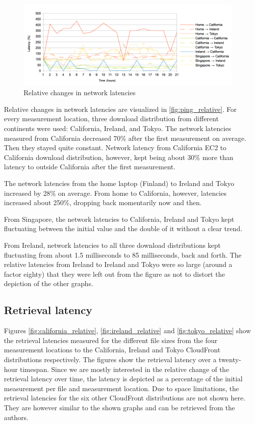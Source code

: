 \documentclass[conference]{IEEEtran}
\begin{document}
\begin{figure}[h]
    \centering
    \includegraphics[width=6in]{images/pings_relative.png}
    \caption[]{Relative changes in network latencies}
    \label{fig:ping_relative}
\end{figure}

Relative changes in network latencies are visualized in \autoref{fig:ping_relative}. For every measurement location, three download distribution from different continents were used: California, Ireland, and Tokyo. The network latencies measured from California decreased 70\% after the first measurement on average. Then they stayed quite constant. Network latency from California EC2 to California download distribution, however, kept being about 30\% more than latency to outside California after the first measurement.

The network latencies from the home laptop (Finland) to Ireland and Tokyo increased by 28\% on average. From home to California, however, latencies increased about 250\%, dropping back momentarily now and then.

From Singapore, the network latencies to California, Ireland and Tokyo kept fluctuating between the initial value and the double of it without a clear trend.

From Ireland, network latencies to all three download distributions kept fluctuating from about 1.5 milliseconds to 85 milliseconds, back and forth. The relative latencies from Ireland to Ireland and Tokyo were so large (around a factor eighty) that they were left out from the figure as not to distort the depiction of the other graphs.

\subsection{Retrieval latency}
Figures \ref{fig:california_relative}, \ref{fig:ireland_relative} and \ref{fig:tokyo_relative} show the retrieval latencies measured for the different file sizes from the four measurement locations to the California, Ireland and Tokyo CloudFront distributions respectively. The figures show the retrieval latency over a twenty-hour timespan. Since we are mostly interested in the relative change of the retrieval latency over time, the latency is depicted as a percentage of the initial measurement per file and measurement location. Due to space limitations, the retrieval latencies for the six other CloudFront distributions are not shown here. They are however similar to the shown graphs and can be retrieved from the authors.
\end{document}

